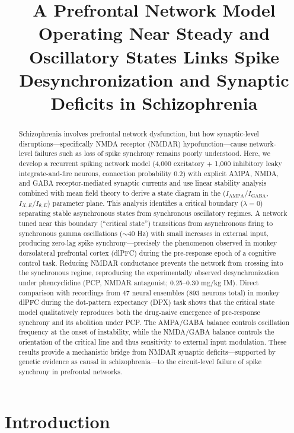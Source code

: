 \documentclass[11pt]{article}
\title{A Prefrontal Network Model Operating Near Steady and Oscillatory States Links Spike Desynchronization and Synaptic Deficits in Schizophrenia}
\author{}
\date{}
\begin{document}
\maketitle

\begin{abstract}
Schizophrenia involves prefrontal network dysfunction, but how synaptic-level disruptions---specifically NMDA receptor (NMDAR) hypofunction---cause network-level failures such as loss of spike synchrony remains poorly understood. Here, we develop a recurrent spiking network model (4,000 excitatory + 1,000 inhibitory leaky integrate-and-fire neurons, connection probability 0.2) with explicit AMPA, NMDA, and GABA receptor-mediated synaptic currents and use linear stability analysis combined with mean field theory to derive a state diagram in the ($I_{\mathrm{AMPA}}/I_{\mathrm{GABA}}$, $I_{X,E}/I_{\theta,E}$) parameter plane. This analysis identifies a critical boundary ($\lambda = 0$) separating stable asynchronous states from synchronous oscillatory regimes. A network tuned near this boundary (``critical state'') transitions from asynchronous firing to synchronous gamma oscillations ($\sim$40 Hz) with small increases in external input, producing zero-lag spike synchrony---precisely the phenomenon observed in monkey dorsolateral prefrontal cortex (dlPFC) during the pre-response epoch of a cognitive control task. Reducing NMDAR conductance prevents the network from crossing into the synchronous regime, reproducing the experimentally observed desynchronization under phencyclidine (PCP, NMDAR antagonist; 0.25--0.30 mg/kg IM). Direct comparison with recordings from 47 neural ensembles (893 neurons total) in monkey dlPFC during the dot-pattern expectancy (DPX) task shows that the critical state model qualitatively reproduces both the drug-naive emergence of pre-response synchrony and its abolition under PCP. The AMPA/GABA balance controls oscillation frequency at the onset of instability, while the NMDA/GABA balance controls the orientation of the critical line and thus sensitivity to external input modulation. These results provide a mechanistic bridge from NMDAR synaptic deficits---supported by genetic evidence as causal in schizophrenia---to the circuit-level failure of spike synchrony in prefrontal networks.
\end{abstract}

\section{Introduction}
\end{document}
